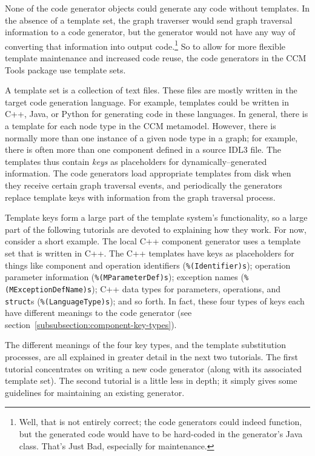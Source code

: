 None of the code generator objects could generate any code without templates. In
the absence of a template set, the graph traverser would send graph traversal
information to a code generator, but the generator would not have any way of
converting that information into output code.\footnote{Well, that is not
entirely correct; the code generators could indeed function, but the generated
code would have to be hard-coded in the generator's Java class. That's Just Bad,
especially for maintenance.} So to allow for more flexible template maintenance
and increased code reuse, the code generators in the CCM Tools package use
template sets.

A template set is a collection of text files. These files are mostly written in
the target code generation language. For example, templates could be written in
C++, Java, or Python for generating code in these languages. In general, there
is a template for each node type in the CCM metamodel. However, there is
normally more than one instance of a given node type in a graph; for example,
there is often more than one component defined in a source IDL3 file. The
templates thus contain {\it keys} as placeholders for dynamically--generated
information. The code generators load appropriate templates from disk when they
receive certain graph traversal events, and periodically the generators replace
template keys with information from the graph traversal process.

Template keys form a large part of the template system's functionality, so a
large part of the following tutorials are devoted to explaining how they work.
For now, consider a short example. The local C++ component generator uses a
template set that is written in C++. The C++ templates have keys as placeholders
for things like component and operation identifiers (\verb+%(Identifier)s+);
operation parameter information (\verb+%(MParameterDef)s+); exception names
(\verb+%(MExceptionDefName)s+); C++ data types for parameters, operations, and
{\tt struct}s (\verb+%(LanguageType)s+); and so forth. In fact, these four types
of keys each have different meanings to the code generator (see
section~\ref{subsubsection:component-key-types}).

The different meanings of the four key types, and the template substitution
processes, are all explained in greater detail in the next two tutorials. The
first tutorial concentrates on writing a new code generator (along with its
associated template set). The second tutorial is a little less in depth; it
simply gives some guidelines for maintaining an existing generator.

